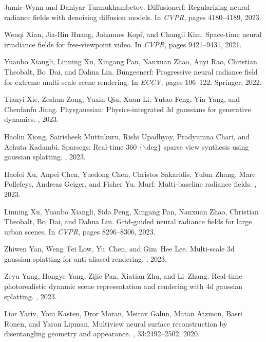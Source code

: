 \documentclass{article}
\begin{document}
{\begin{thebibliography}{10}
Jamie Wynn and Daniyar Turmukhambetov.
\newblock Diffusionerf: Regularizing neural radiance fields with denoising diffusion models.
\newblock In {\em CVPR}, pages 4180--4189, 2023.

Wenqi Xian, Jia-Bin Huang, Johannes Kopf, and Changil Kim.
\newblock Space-time neural irradiance fields for free-viewpoint video.
\newblock In {\em CVPR}, pages 9421--9431, 2021.

Yuanbo Xiangli, Linning Xu, Xingang Pan, Nanxuan Zhao, Anyi Rao, Christian Theobalt, Bo~Dai, and Dahua Lin.
\newblock Bungeenerf: Progressive neural radiance field for extreme multi-scale scene rendering.
\newblock In {\em ECCV}, pages 106--122. Springer, 2022.

Tianyi Xie, Zeshun Zong, Yuxin Qiu, Xuan Li, Yutao Feng, Yin Yang, and Chenfanfu Jiang.
\newblock Physgaussian: Physics-integrated 3d gaussians for generative dynamics.
, 2023.

Haolin Xiong, Sairisheek Muttukuru, Rishi Upadhyay, Pradyumna Chari, and Achuta Kadambi.
\newblock Sparsegs: Real-time 360 $\{$$\backslash$deg$\}$ sparse view synthesis using gaussian splatting.
, 2023.

Haofei Xu, Anpei Chen, Yuedong Chen, Christos Sakaridis, Yulun Zhang, Marc Pollefeys, Andreas Geiger, and Fisher Yu.
\newblock Murf: Multi-baseline radiance fields.
, 2023.

Linning Xu, Yuanbo Xiangli, Sida Peng, Xingang Pan, Nanxuan Zhao, Christian Theobalt, Bo~Dai, and Dahua Lin.
\newblock Grid-guided neural radiance fields for large urban scenes.
\newblock In {\em CVPR}, pages 8296--8306, 2023.

Zhiwen Yan, Weng~Fei Low, Yu~Chen, and Gim~Hee Lee.
\newblock Multi-scale 3d gaussian splatting for anti-aliased rendering.
, 2023.

Zeyu Yang, Hongye Yang, Zijie Pan, Xiatian Zhu, and Li~Zhang.
\newblock Real-time photorealistic dynamic scene representation and rendering with 4d gaussian splatting.
, 2023.

Lior Yariv, Yoni Kasten, Dror Moran, Meirav Galun, Matan Atzmon, Basri Ronen, and Yaron Lipman.
\newblock Multiview neural surface reconstruction by disentangling geometry and appearance.
, 33:2492--2502, 2020.


\end{thebibliography}}
\end{document}
